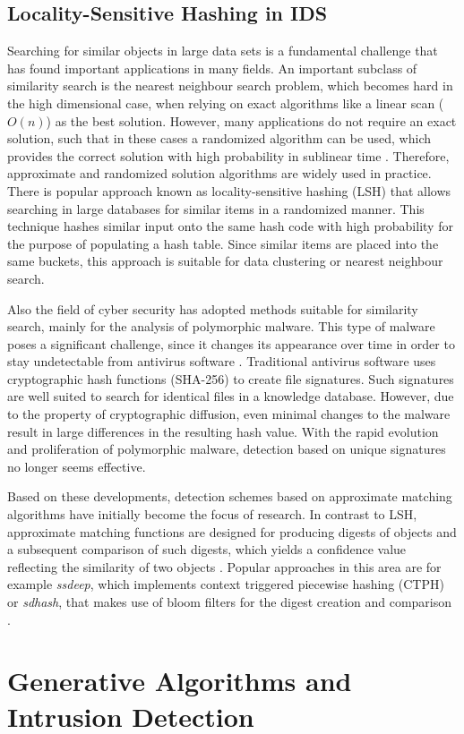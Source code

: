 \subsection{Locality-Sensitive Hashing in IDS}


Searching for similar objects in large data sets is a fundamental challenge that has found important applications in many fields. An important subclass of similarity search is the nearest neighbour search problem, which becomes hard in the high dimensional case, when relying on exact algorithms like a linear scan ($O(n)$) as the best solution. However, many applications do not require an exact solution, such that in these cases a randomized algorithm can be used, which provides the correct solution with high probability in sublinear time \cite{datar_locality-sensitive_2004}. Therefore, approximate and randomized solution algorithms are widely used in practice. There is  popular approach known as locality-sensitive hashing (LSH) that allows searching in large databases for similar items in a randomized manner. This technique hashes similar input onto the same hash code with high probability for the purpose of populating a hash table. Since similar items are placed into the same buckets, this approach is suitable for data clustering or nearest neighbour search.


Also the field of cyber security has adopted methods suitable for similarity search, mainly for the analysis of polymorphic malware. This type of malware poses a significant challenge, since it changes its appearance over time in order to stay undetectable from antivirus software \cite[p.91]{whitman_principles_2018}. 
Traditional antivirus software uses cryptographic hash functions (SHA-256) to create file signatures. Such signatures are well suited to search for identical files in a knowledge database. However, due to the property of cryptographic diffusion, even minimal changes to the malware result in large differences in the resulting hash value. With the rapid evolution and proliferation of polymorphic malware, detection based on unique signatures no longer seems effective. 

Based on these developments, detection schemes based on approximate matching algorithms have initially become the focus of research. In contrast to LSH, approximate matching functions are designed for producing digests of objects and a subsequent comparison of such digests, which yields a confidence value reflecting the similarity of two objects \cite{moia_similarity_2017}. Popular approaches in this area are for example \textit{ssdeep}, which implements context triggered piecewise hashing (CTPH) \cite{kornblum_identifying_2006} or \textit{sdhash}, that makes use of bloom filters for the digest creation and comparison \cite{chow_data_2010}.

\section{Generative Algorithms and Intrusion Detection}